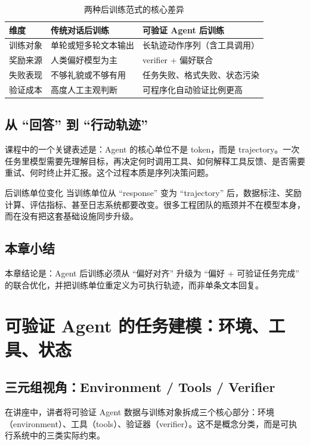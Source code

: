 \documentclass[a4paper]{article}
\begin{document}
\begin{table}[H]
\centering
\begin{tabular}{p{2.8cm}p{4.1cm}p{4.6cm}}
\toprule
\textbf{维度} & \textbf{传统对话后训练} & \textbf{可验证 Agent 后训练} \\
\midrule
训练对象 & 单轮或短多轮文本输出 & 长轨迹动作序列（含工具调用） \\
奖励来源 & 人类偏好模型为主 & verifier + 偏好联合 \\
失败表现 & 不够礼貌或不够有用 & 任务失败、格式失败、状态污染 \\
验证成本 & 高度人工主观判断 & 可程序化自动验证比例更高 \\
\bottomrule
\end{tabular}
\caption{两种后训练范式的核心差异}
\end{table}

\subsection{从 ``回答'' 到 ``行动轨迹''}
课程中的一个关键表述是：Agent 的核心单位不是 token，而是 trajectory。一次任务里模型需要先理解目标，再决定何时调用工具、如何解释工具反馈、是否需要重试、何时终止并汇报。这个过程本质是序列决策问题。

\begin{importantbox}{后训练单位变化}
当训练单位从 ``response'' 变为 ``trajectory'' 后，数据标注、奖励计算、评估指标、甚至日志系统都要改变。很多工程团队的瓶颈并不在模型本身，而在没有把这套基础设施同步升级。
\end{importantbox}

\subsection{本章小结}
本章结论是：Agent 后训练必须从 ``偏好对齐'' 升级为 ``偏好 + 可验证任务完成'' 的联合优化，并把训练单位重定义为可执行轨迹，而非单条文本回复。

\section{可验证 Agent 的任务建模：环境、工具、状态}

\subsection{三元组视角：Environment / Tools / Verifier}
在讲座中，讲者将可验证 Agent 数据与训练对象拆成三个核心部分：环境（environment）、工具（tools）、验证器（verifier）。这不是概念分类，而是可执行系统中的三类实际约束。
\end{document}

